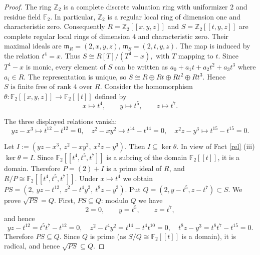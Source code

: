 \documentclass[10pt,a4paper]{amsart}
\begin{document}
\begin{proof}
	
	
The ring $\mathbb Z_2$ is a complete discrete valuation ring with
 uniformizer $2$ and residue field $\mathbb F_2$.  In particular,
 $\mathbb Z_2$ is a regular local ring of dimension one and
 characteristic zero.
 Consequently
 \(
 R=\mathbb Z_2[[x,y,z]]
 \)
 and
 \(
 S=\mathbb Z_2[[t,y,z]]
 \)
 are complete regular local rings of dimension $4$ and characteristic
 zero.  Their maximal ideals are
 \(
 \mathfrak m_R=(2,x,y,z) \),
 \( \mathfrak m_S=(2,t,y,z).
 \)
The map is induced by the relation
 \(
 t^4=x.
 \)
 Thus
 \(
 S\cong R[T]/(T^4-x),
 \)
 with $T$ mapping to $t$.
 Since $T^4-x$ is monic, every element of $S$ can be written as
 \(
 a_0+a_1t+a_2t^2+a_3t^3\)
where  \(a_i\in R.
 \)
 The representation is unique, so
 \(
 S\cong R\oplus Rt\oplus Rt^2\oplus Rt^3.
 \)
  Hence
 \(
 {S\text{ is finite free of rank }4\text{ over }R.}
 \)
Consider the homomorphism
\(
\theta:\mathbb F_2[[x,y,z]]
\to
\mathbb F_2[[t]]
\)
defined by
\[
x\longmapsto t^4,\qquad
y\longmapsto t^5,\qquad
z\longmapsto t^7.
\]

The three displayed relations vanish:
\[
yz-x^3
\longmapsto
t^{12}-t^{12}=0,
\quad
z^2-xy^2
\longmapsto
t^{14}-t^{14}=0,
\quad
x^2z-y^3
\longmapsto
t^{15}-t^{15}=0.
\]

Let
\(
I:=(yz-x^3,\ z^2-xy^2,\ x^2z-y^3).
\)
Then
\(
I\subseteq\ker\theta.
\)
In view of {Fact} \ref{rel} (iii)
\(
\ker\theta=I.
\)
Since \(\mathbb F_2[[t^4,t^5,t^7]]\) is a subring of the domain
\(\mathbb F_2[[t]]\), it is a domain. 
Therefore
\(
P=(2)+I
\)
is a prime ideal of \(R\), and
\(
R/P\cong\mathbb F_2[[t^4,t^5,t^7]].
\)
Under \(x\mapsto t^4\) we obtain
\(
PS=
(2,\ yz-t^{12},\ z^2-t^4y^2,\ t^8z-y^3).
\)
Put
\(
Q=(2,y-t^5,z-t^7)\subset S.
\)
We prove
\(
\sqrt{PS}=Q.
\)
First, \(PS\subseteq Q\): modulo \(Q\) we have
\[
2=0,\qquad y=t^5,\qquad z=t^7,
\]
and hence
\[
yz-t^{12}=t^5t^7-t^{12}=0,
\quad
z^2-t^4y^2=t^{14}-t^4t^{10}=0,
\quad
t^8z-y^3=t^8t^7-t^{15}=0.
\]
Therefore
\(
PS\subseteq Q.
\)
Since \(Q\) is prime (as \(S/Q\cong\mathbb F_2[[t]]\) is a domain),
it is radical, and hence
\(
\sqrt{PS}\subseteq Q.
\)


\end{proof}
\end{document}
